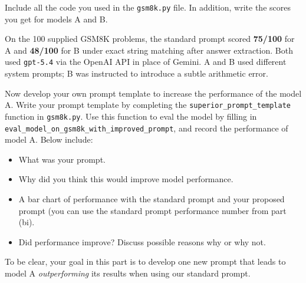 \begin{parts}
\begin{subparts}
        Include all the code you used in the \texttt{gsm8k.py} file. In addition, write the scores 
        you get for models A and B.
        
        \begin{answer}
        On the 100 supplied GSM8K problems, the standard prompt scored
        \textbf{75/100} for A and \textbf{48/100} for B under exact string matching
        after answer extraction. Both used \texttt{gpt-5.4} via the OpenAI
        API in place of Gemini. A and B used different system prompts; B was
        instructed to introduce a subtle arithmetic error.
        \end{answer}

        \subpart[3] Now develop your own prompt template to increase the performance of the model A.
        Write your prompt template by completing the \texttt{superior\_prompt\_template} 
        function in \texttt{gsm8k.py}. Use 
        this function to eval the model by filling in 
        \texttt{eval\_model\_on\_gsm8k\_with\_improved\_prompt}, and record the performance of model A. Below 
        include:

        \begin{itemize}
            \item What was your prompt.
            \item Why did you think this would improve model performance.
            \item A bar chart of performance with the standard prompt and your proposed prompt (you can use the standard 
            prompt performance number from 
            part (bi).
            \item Did performance improve? Discuss possible reasons why or why not.
        \end{itemize}

        To be clear, your goal in this part is to develop 
        one new prompt that leads to model A 
        \emph{outperforming} its results 
        when using our standard prompt.
        

        
    \end{subparts}


\end{parts}
